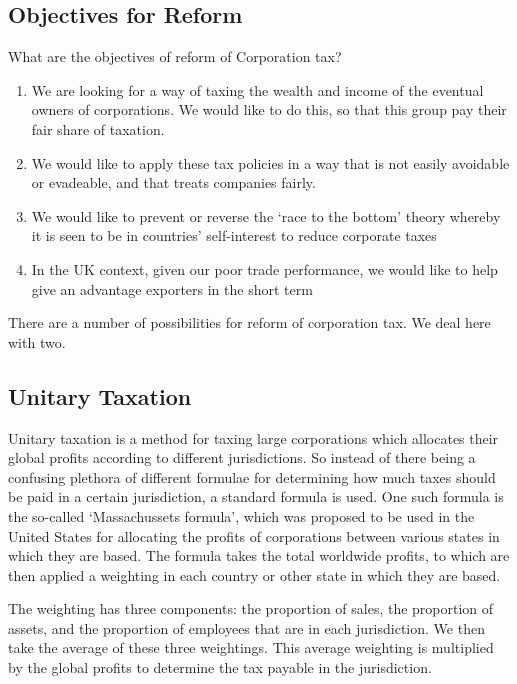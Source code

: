 \documentclass[]{tufte-handout}
\providecommand{\tightlist}{%
  \setlength{\itemsep}{0pt}\setlength{\parskip}{0pt}}
\begin{document}
\hypertarget{objectives-for-reform}{%
\subsection{Objectives for Reform}\label{objectives-for-reform}}

What are the objectives of reform of Corporation tax?

\begin{enumerate}
\def\labelenumi{\arabic{enumi}.}
\tightlist
\item
  We are looking for a way of taxing the wealth and income of the
  eventual owners of corporations. We would like to do this, so that
  this group pay their fair share of taxation.
\item
  We would like to apply these tax policies in a way that is not easily
  avoidable or evadeable, and that treats companies fairly.
\item
  We would like to prevent or reverse the `race to the bottom' theory
  whereby it is seen to be in countries' self-interest to reduce
  corporate taxes
\item
  In the UK context, given our poor trade performance, we would like to
  help give an advantage exporters in the short term
\end{enumerate}

There are a number of possibilities for reform of corporation tax. We
deal here with two.

\hypertarget{unitary-taxation}{%
\subsection{Unitary Taxation}\label{unitary-taxation}}

Unitary taxation is a method for taxing large corporations which
allocates their global profits according to different jurisdictions. So
instead of there being a confusing plethora of different formulae for
determining how much taxes should be paid in a certain jurisdiction, a
standard formula is used. One such formula is the so-called
`Massachussets formula', which was proposed to be used in the United
States for allocating the profits of corporations between various states
in which they are based. The formula takes the total worldwide profits,
to which are then applied a weighting in each country or other state in
which they are based.

The weighting has three components: the proportion of sales, the
proportion of assets, and the proportion of employees that are in each
jurisdiction. We then take the average of these three weightings. This
average weighting is multiplied by the global profits to determine the
tax payable in the jurisdiction.
\end{document}
